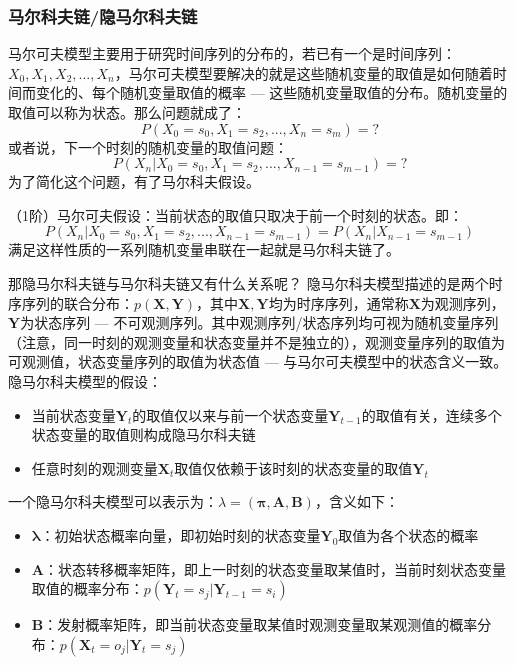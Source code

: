 \subsubsection{马尔科夫链/隐马尔科夫链}
马尔可夫模型主要用于研究时间序列的分布的，若已有一个是时间序列：$X_0, X_1, X_2, ..., X_n$，马尔可夫模型要解决的就是这些随机变量的取值是如何随着时间而变化的、每个随机变量取值的概率 --- 这些随机变量取值的分布。随机变量的取值可以称为状态。那么问题就成了：
$$
P(X_0=s_0, X_1=s_2, ..., X_n=s_m) = ?
$$
或者说，下一个时刻的随机变量的取值问题：
$$
P(X_n | X_0=s_0, X_1=s_2, ..., X_{n-1}=s_{m-1}) = ?
$$
为了简化这个问题，有了马尔科夫假设。

（1阶）马尔可夫假设：当前状态的取值只取决于前一个时刻的状态。即：
$$
P(X_n | X_0=s_0, X_1=s_2, ..., X_{n-1}=s_{m-1}) = P(X_n | X_{n-1}=s_{m-1})
$$
满足这样性质的一系列随机变量串联在一起就是马尔科夫链了。

那隐马尔科夫链与马尔科夫链又有什么关系呢？
隐马尔科夫模型描述的是两个时序序列的联合分布：$p( \boldsymbol{X}, \boldsymbol{Y} )$，其中$\boldsymbol{X}, \boldsymbol{Y}$均为时序序列，通常称$\boldsymbol{X}$为观测序列，$\boldsymbol{Y}$为状态序列 --- 不可观测序列。其中观测序列/状态序列均可视为随机变量序列（注意，同一时刻的观测变量和状态变量并不是独立的），观测变量序列的取值为可观测值，状态变量序列的取值为状态值 --- 与马尔可夫模型中的状态含义一致。隐马尔科夫模型的假设：
\begin{itemize}
	\item 当前状态变量$\boldsymbol{Y}_t$的取值仅以来与前一个状态变量$\boldsymbol{Y}_{t-1}$的取值有关，连续多个状态变量的取值则构成隐马尔科夫链
	\item 任意时刻的观测变量$\boldsymbol{X}_t$取值仅依赖于该时刻的状态变量的取值$\boldsymbol{Y}_t$
\end{itemize}

一个隐马尔科夫模型可以表示为：$\lambda = (\boldsymbol{\pi}, \boldsymbol{A}, \boldsymbol{B})$，含义如下：
\begin{itemize}
	\item $\boldsymbol{\lambda}$：初始状态概率向量，即初始时刻的状态变量$\boldsymbol{Y}_0$取值为各个状态的概率
	\item $\boldsymbol{A}$：状态转移概率矩阵，即上一时刻的状态变量取某值时，当前时刻状态变量取值的概率分布：$p(\boldsymbol{Y}_t=s_j | \boldsymbol{Y}_{t-1}=s_i)$
	\item $\boldsymbol{B}$：发射概率矩阵，即当前状态变量取某值时观测变量取某观测值的概率分布：$p(\boldsymbol{X}_t=o_j | \boldsymbol{Y}_t=s_j)$
\end{itemize}

